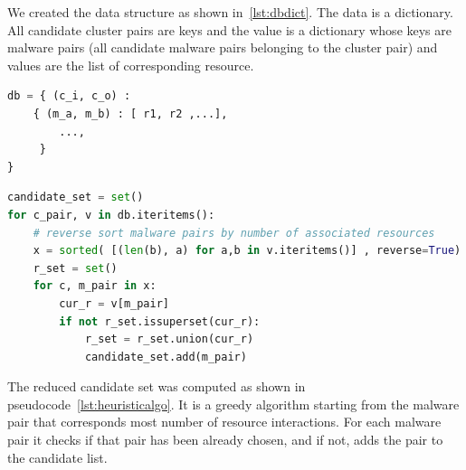 We created the data structure as shown in~\ref{lst:dbdict}.
The data is a dictionary.
All candidate cluster pairs are keys and the value is a dictionary whose keys are malware pairs (all candidate malware pairs belonging to the cluster pair) and values are the list of corresponding resource.
\begin{lstlisting}[language=python,floatplacement=htpb,caption={Database Structure},label={lst:dbdict}]
db = { (c_i, c_o) :
    { (m_a, m_b) : [ r1, r2 ,...],
        ...,
     }
}
\end{lstlisting}
\begin{lstlisting}[float,floatplacement=htbp,language=python,caption={Pseudo code (Python) to get minimal set of candidates for all resource},label={lst:heuristicalgo}]
candidate_set = set()
for c_pair, v in db.iteritems():
    # reverse sort malware pairs by number of associated resources
    x = sorted( [(len(b), a) for a,b in v.iteritems()] , reverse=True)
    r_set = set()
    for c, m_pair in x:
        cur_r = v[m_pair]
        if not r_set.issuperset(cur_r):
            r_set = r_set.union(cur_r)
            candidate_set.add(m_pair)
\end{lstlisting}

The reduced candidate set was computed as shown in pseudocode~\ref{lst:heuristicalgo}.
It is a greedy algorithm starting from the malware pair that corresponds most number of resource interactions.
For each malware pair it checks if that pair has been already chosen, and if not, adds the pair to the candidate list.
